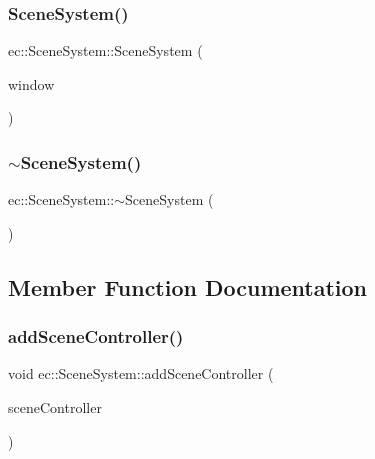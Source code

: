 \subsubsection{\texorpdfstring{Scene\+System()}{SceneSystem()}}
{\footnotesize\ttfamily ec\+::\+Scene\+System\+::\+Scene\+System (\begin{DoxyParamCaption}\item[{\mbox{\hyperlink{classec_1_1_window}{Window}} $\ast$}]{window }\end{DoxyParamCaption})\hspace{0.3cm}{\ttfamily [explicit]}}

\mbox{\label{classec_1_1_scene_system_a612e6cc45dbea62c7ffa4c752f965482}} 
\subsubsection{\texorpdfstring{$\sim$\+Scene\+System()}{~SceneSystem()}}
{\footnotesize\ttfamily ec\+::\+Scene\+System\+::$\sim$\+Scene\+System (\begin{DoxyParamCaption}{ }\end{DoxyParamCaption})\hspace{0.3cm}{\ttfamily [default]}}



\subsection{Member Function Documentation}
\mbox{\label{classec_1_1_scene_system_a6f59921ccb0a64ead95efc6ef34ffac1}} 
\subsubsection{\texorpdfstring{add\+Scene\+Controller()}{addSceneController()}}
{\footnotesize\ttfamily void ec\+::\+Scene\+System\+::add\+Scene\+Controller (\begin{DoxyParamCaption}\item[{std\+::unique\+\_\+ptr$<$ \mbox{\hyperlink{classec_1_1_scene_controller}{Scene\+Controller}} $>$}]{scene\+Controller }\end{DoxyParamCaption})}

